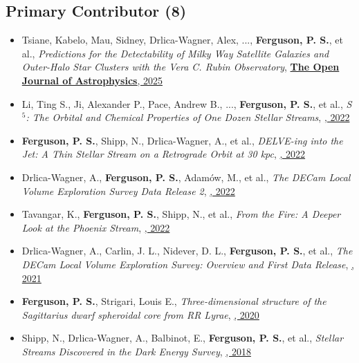 \renewcommand{\labelitemi}{$$}
\subsection{Primary Contributor  (8)}
\begin{itemize}[itemsep=1pt]
    \item {Tsiane}, Kabelo, {Mau}, Sidney, {Drlica-Wagner}, Alex, ..., \textbf{Ferguson, P. S.}, et al., \textit{{Predictions for the Detectability of Milky Way Satellite Galaxies and Outer-Halo Star Clusters with the Vera C. Rubin Observatory}}, \href{https://ui.adsabs.harvard.edu/abs/2025OJAp....8E..89T}{\textbf{The Open Journal of Astrophysics}, 2025}
    \item {Li}, Ting S., {Ji}, Alexander P., {Pace}, Andrew B., ..., \textbf{Ferguson, P. S.}, et al., \textit{{S $^{5}$: The Orbital and Chemical Properties of One Dozen Stellar Streams}}, \href{https://ui.adsabs.harvard.edu/abs/2022ApJ...928...30L}{\textbf{\apj}, 2022}
    \item \textbf{Ferguson, P. S.}, {Shipp}, N., {Drlica-Wagner}, A., et al., \textit{{DELVE-ing into the Jet: A Thin Stellar Stream on a Retrograde Orbit at 30 kpc}}, \href{https://ui.adsabs.harvard.edu/abs/2022AJ....163...18F}{\textbf{\aj}, 2022}
    \item {Drlica-Wagner}, A., \textbf{Ferguson, P. S.}, {Adam{\'o}w}, M., et al., \textit{{The DECam Local Volume Exploration Survey Data Release 2}}, \href{https://ui.adsabs.harvard.edu/abs/2022ApJS..261...38D}{\textbf{\apjs}, 2022}
    \item {Tavangar}, K., \textbf{Ferguson, P. S.}, {Shipp}, N., et al., \textit{{From the Fire: A Deeper Look at the Phoenix Stream}}, \href{https://ui.adsabs.harvard.edu/abs/2022ApJ...925..118T}{\textbf{\apj}, 2022}
    \item {Drlica-Wagner}, A., {Carlin}, J. L., {Nidever}, D. L., \textbf{Ferguson, P. S.}, et al., \textit{{The DECam Local Volume Exploration Survey: Overview and First Data Release}}, \href{https://ui.adsabs.harvard.edu/abs/2021ApJS..256....2D}{\textbf{\apjs}, 2021}
    \item \textbf{Ferguson, P. S.}, {Strigari}, Louis E., \textit{{Three-dimensional structure of the Sagittarius dwarf spheroidal core from RR Lyrae}}, \href{https://ui.adsabs.harvard.edu/abs/2020MNRAS.495.4124F}{\textbf{\mnras}, 2020}
    \item {Shipp}, N., {Drlica-Wagner}, A., {Balbinot}, E., \textbf{Ferguson, P. S.}, et al., \textit{{Stellar Streams Discovered in the Dark Energy Survey}}, \href{https://ui.adsabs.harvard.edu/abs/2018ApJ...862..114S}{\textbf{\apj}, 2018}
\end{itemize}
